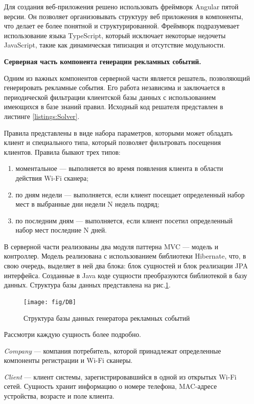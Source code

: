 Для создания веб-приложения решено использовать фреймворк Angular пятой версии. Он позволяет организовывать структуру веб приложения в компоненты, что делает ее более понятной и структурированной. Фреймворк подразумевает использование языка TypeScript, который исключает некоторые недочеты JavaScript, такие как динамическая типизация и отсутствие модульности.

\textbf{Серверная часть компонента генерации рекламных событий.}

Одним из важных компонентов серверной части является решатель, позволяющий генерировать рекламные события. Его работа независима и заключается в периодической фильтрации клиентской базы данных с использованием им{}еющихся в базе знаний правил. Исходный код решателя представлен в листинге \ref{listings:Solver}.

Правила представлены в виде набора параметров, которыми может обладать клиент и специального типа, который позволяет фильтровать посещения клиентов. Правила бывают трех типов:

\begin{enumerate}
	\item моментальное --- выполняется во время появления клиента в области действия Wi-Fi сканера;
	\item по дням недели --- выполняется, если клиент посещает определенный набор мест в выбранные дни недели N недель подряд;
	\item по последним дням --- выполняется, если клиент посетил определенный набор мест последние N дней.
\end{enumerate}

В серверной части реализованы два модуля паттерна MVC --- модель и контроллер. Модель реализована с использованием библиотеки Hibernate, что, в свою очередь, выделяет в ней два блока: блок сущностей и блок реализации JPA интерфейса. Созданные в Java коде сущности преобразуются библиотекой в базу данных. Структура базы данных представлена на рис.\ref{fig:DB}.

\begin{figure}[h]
	\centering
	\texttt{[image: fig/DB]}
	\caption{Структура базы данных генератора рекламных событий}
	\label{fig:DB}
\end{figure}

Рассмотри каждую сущность более подробно.

\textit{Company} --- компания потребитель, которой принадлежат определенные компоненты регистрации и Wi-Fi сканеры.  

\textit{Client} --- клиент системы, зарегистрировавшийся в одной из открытых Wi-Fi сетей. Сущность хранит информацию о номере телефона, MAC-адресе устройства, возрасте  и поле клиента.

